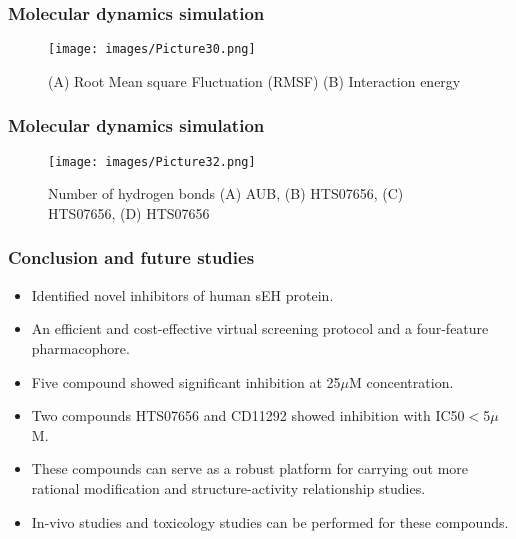 \documentclass{beamer}
\begin{document}
\begin{frame}
\frametitle{\textbf{Molecular dynamics simulation}}
\begin{figure}
\texttt{[image: images/Picture30.png]}
\caption{(A) Root Mean square Fluctuation (RMSF) (B) Interaction energy}
\end{figure}
\end{frame}

\begin{frame}
\frametitle{\textbf{Molecular dynamics simulation}}
\begin{figure}
\texttt{[image: images/Picture32.png]}
\caption{Number of hydrogen bonds (A) AUB, (B) HTS07656, (C) HTS07656, (D) HTS07656}
\end{figure}
\end{frame}

\begin{frame}
\frametitle{\textbf{Conclusion and future studies}}
\begin{itemize}
\item Identified novel inhibitors of human sEH protein.
\item An efficient and cost-effective virtual screening protocol and a four-feature pharmacophore.
\item Five compound showed significant inhibition at 25$\mu$M concentration.
\item Two compounds HTS07656 and CD11292 showed inhibition with IC50$<$5$\mu$M.
\item These compounds can serve as a robust platform for carrying out more rational modification and structure-activity relationship studies.
\item In-vivo studies and toxicology studies can be performed for these compounds.
\end{itemize}
\end{frame}
\end{document}
